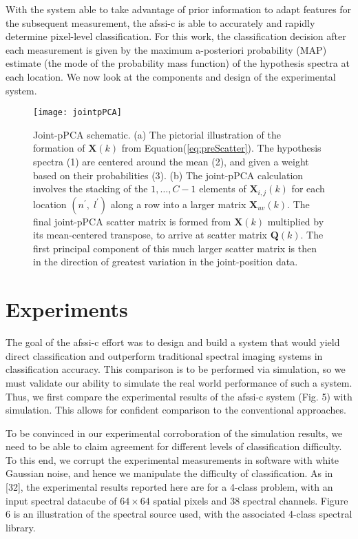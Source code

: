 With the system able to take advantage of prior information to adapt features for the subsequent measurement, the \gls{afssi-c} is able to accurately and rapidly determine pixel-level classification. For this work, the classification decision after each measurement is given by the maximum a-posteriori probability (MAP) estimate (the mode of the probability mass function)\cite{poor2013introduction} of the hypothesis spectra at each location. We now look at the components and design of the experimental system. 


\begin{figure}[htb]
	\centering
	\texttt{[image: jointpPCA]}\\
	\caption{Joint-pPCA schematic. (a) The pictorial illustration of the formation of $\textbf{X}(k)$ from Equation(\ref{eq:preScatter}). The hypothesis spectra (1) are centered around the mean (2), and given a weight based on their probabilities (3).  (b) The joint-pPCA calculation involves the stacking of the $1, \ldots, C-1$ elements of $\textbf{X}_{i, j}(k)$ for each location $\left( n^\prime,\;l^\prime \right)$ along a row into a larger matrix $\textbf{\~X}_{uv}(k)$. The final joint-pPCA scatter matrix is formed from $\textbf{\~X}(k)$ multiplied by its mean-centered transpose, to arrive at scatter matrix $\textbf{\~Q}(k)$. The first principal component of this much larger scatter matrix is then in the direction of greatest variation in the joint-position data.}\label{fig:jointpPCA}
\end{figure}



\section{Experiments}

The goal of the \gls{afssi-c} effort was to design and build a system that would yield direct classification and outperform traditional spectral imaging systems in classification accuracy. This comparison is to be performed via simulation, so we must validate our ability to simulate the real world performance of such a system. Thus, we first compare the experimental results of the \gls{afssi-c} system (Fig. 5) with simulation. This allows for confident comparison to the conventional approaches.

To be convinced in our experimental corroboration of the simulation results, we need to be able to claim agreement for different levels of classification difficulty. To this end, we corrupt the experimental measurements in software with white Gaussian noise, and hence we manipulate the difficulty of classification. As in [32], the experimental results reported here are for a 4-class problem, with an input spectral datacube of $64 \times 64$ spatial pixels and 38 spectral channels. Figure 6 is an illustration of the spectral source used, with the associated 4-class spectral library.

